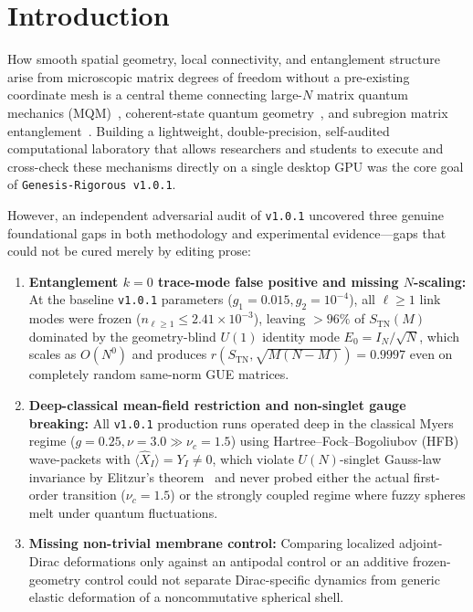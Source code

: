 \documentclass[11pt,a4paper]{article}
\begin{document}
\begin{abstract}
single-body curvature sign separates prolate commutator-tension pinching ($+11.3\%$) from oblate radial indentation ($-9.8\%$).
\end{abstract}

\tableofcontents
\newpage

\section{Introduction}
\label{sec:intro}

How smooth spatial geometry, local connectivity, and entanglement structure arise from microscopic matrix degrees of freedom without a pre-existing coordinate mesh is a central theme connecting large-$N$ matrix quantum mechanics (MQM)~\cite{Banks1997,Ishibashi1997,Madore1992,Myers1999,Azuma2004,DelgadilloBlando2008,Steinacker2024}, coherent-state quantum geometry~\cite{Provost1980,Berenstein2012,Ishiki2015,Schneiderbauer2016}, and subregion matrix entanglement~\cite{Ryu2006,Han2020,Gautam2022,Gautam2025,Frenkel2024,Fliss2025}. Building a lightweight, double-precision, self-audited computational laboratory that allows researchers and students to execute and cross-check these mechanisms directly on a single desktop GPU was the core goal of \texttt{Genesis-Rigorous v1.0.1}.

However, an independent adversarial audit of \texttt{v1.0.1} uncovered three genuine foundational gaps in both methodology and experimental evidence—gaps that could not be cured merely by editing prose:
\begin{enumerate}
  \item \textbf{Entanglement $k=0$ trace-mode false positive and missing $N$-scaling:} At the baseline \texttt{v1.0.1} parameters ($g_1=0.015, g_2=10^{-4}$), all $\ell \ge 1$ link modes were frozen ($n_{\ell\ge 1} \le 2.41\times 10^{-3}$), leaving $>96\%$ of $S_{\mathrm{TN}}(M)$ dominated by the geometry-blind $U(1)$ identity mode $E_0 = I_N/\sqrt{N}$, which scales as $O(N^0)$ and produces $r(S_{\mathrm{TN}}, \sqrt{M(N-M)}) = 0.9997$ even on completely random same-norm GUE matrices.
  \item \textbf{Deep-classical mean-field restriction and non-singlet gauge breaking:} All \texttt{v1.0.1} production runs operated deep in the classical Myers regime ($g=0.25, \nu=3.0 \gg \nu_c = 1.5$) using Hartree--Fock--Bogoliubov (HFB) wave-packets with $\langle\hat{X}_I\rangle = Y_I \neq 0$, which violate $U(N)$-singlet Gauss-law invariance by Elitzur's theorem~\cite{Elitzur1975} and never probed either the actual first-order transition ($\nu_c = 1.5$) or the strongly coupled regime where fuzzy spheres melt under quantum fluctuations.
  \item \textbf{Missing non-trivial membrane control:} Comparing localized adjoint-Dirac deformations only against an antipodal control or an additive frozen-geometry control could not separate Dirac-specific dynamics from generic elastic deformation of a noncommutative spherical shell.
\end{enumerate}
\end{document}
